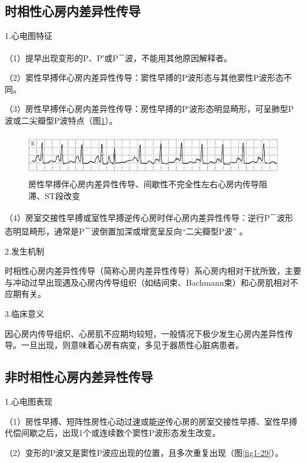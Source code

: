\subsection{时相性心房内差异性传导}

1.心电图特征

（1）提早出现变形的P、P′或P\textsuperscript{－}波，不能用其他原因解释者。

（2）窦性早搏伴心房内差异性传导：窦性早搏的P波形态与其他窦性P波形态不同。

（3）房性早搏伴心房内差异性传导：房性早搏的P′波形态明显畸形，可呈肺型P波或二尖瓣型P波特点（图\ref{fig1-28}）。

\begin{figure}[!htbp]
 \centering
 \includegraphics[width=5.64583in,height=0.72917in]{./images/Image00034.jpg}
 \captionsetup{justification=centering}
 \caption{房性早搏伴心房内差异性传导、间歇性不完全性左右心房内传导阻滞、ST段改变}
 \label{fig1-28}
  \end{figure} 

（4）房室交接性早搏或室性早搏逆传心房时伴心房内差异性传导：逆行P\textsuperscript{－}波形态明显畸形，通常是P\textsuperscript{－}波倒置加深或增宽呈反向“二尖瓣型P波” 。

2.发生机制

时相性心房内差异性传导（简称心房内差异性传导）系心房内相对干扰所致，主要与冲动过早出现遇及心房内传导组织（如结间束、Bachmann束）和心房肌相对不应期有关。

3.临床意义

因心房内传导组织、心房肌不应期均较短，一般情况下极少发生心房内差异性传导。一旦出现，则意味着心房有病变，多见于器质性心脏病患者。

\protect\hypertarget{text00007.htmlux5cux23subid27}{}{}

\subsection{非时相性心房内差异性传导}

1.心电图表现

（1）房性早搏、短阵性房性心动过速或能逆传心房的房室交接性早搏、室性早搏代偿间歇之后，出现1个或连续数个窦性P波形态发生改变。

（2）变形的P波又是窦性P波应出现的位置，且多次重复出现（图\ref{fig1-29}）。

